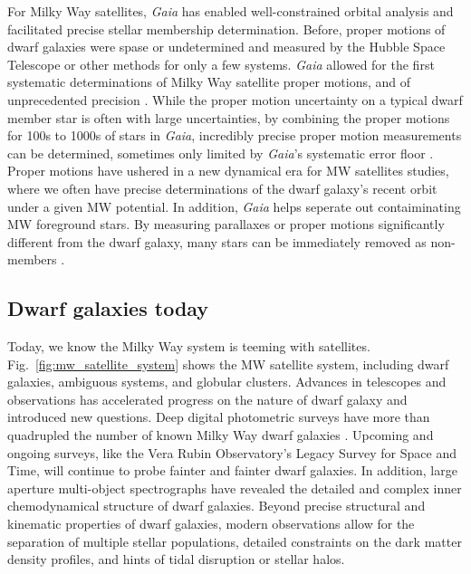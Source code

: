 For Milky Way satellites, \emph{Gaia} has enabled well-constrained
orbital analysis and facilitated precise stellar membership
determination. Before, proper motions of dwarf galaxies were spase or
undetermined and measured by the Hubble Space Telescope or other methods
for only a few systems. \emph{Gaia} allowed for the first systematic
determinations of Milky Way satellite proper motions, and of
unprecedented precision \citep{MV2020a, pace+li2019}. While the proper
motion uncertainty on a typical dwarf member star is often with large
uncertainties, by combining the proper motions for 100s to 1000s of
stars in \emph{Gaia}, incredibly precise proper motion measurements can
be determined, sometimes only limited by \emph{Gaia}'s systematic error
floor \citep[e.g.,][]{MV2020a}. Proper motions have ushered in a new
dynamical era for MW satellites studies, where we often have precise
determinations of the dwarf galaxy's recent orbit under a given MW
potential. In addition, \emph{Gaia} helps seperate out contaiminating MW
foreground stars. By measuring parallaxes or proper motions
significantly different from the dwarf galaxy, many stars can be
immediately removed as non-members
\citep[e.g.,][\citet{jensen2024}]{battaglia+2022}.

\subsection{Dwarf galaxies today}\label{dwarf-galaxies-today}

Today, we know the Milky Way system is teeming with satellites.
Fig.~\ref{fig:mw_satellite_system} shows the MW satellite system,
including dwarf galaxies, ambiguous systems, and globular clusters.
Advances in telescopes and observations has accelerated progress on the
nature of dwarf galaxy and introduced new questions. Deep digital
photometric surveys have more than quadrupled the number of known Milky
Way dwarf galaxies \citep{simon2019}. Upcoming and ongoing surveys, like
the Vera Rubin Observatory's Legacy Survey for Space and Time, will
continue to probe fainter and fainter dwarf galaxies. In addition, large
aperture multi-object spectrographs have revealed the detailed and
complex inner chemodynamical structure of dwarf galaxies. Beyond precise
structural and kinematic properties of dwarf galaxies, modern
observations allow for the separation of multiple stellar populations,
detailed constraints on the dark matter density profiles, and hints of
tidal disruption or stellar halos.

